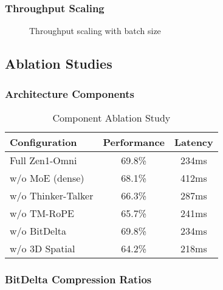 \subsubsection{Throughput Scaling}

\begin{figure}[h]
\centering
{}
\caption{Throughput scaling with batch size}
\end{figure}

\subsection{Ablation Studies}

\subsubsection{Architecture Components}

\begin{table}[h]
\centering
\caption{Component Ablation Study}
\begin{tabular}{lcc}
\hline
\textbf{Configuration} & \textbf{Performance} & \textbf{Latency} \\
\hline
Full Zen1-Omni & 69.8\% & 234ms \\
w/o MoE (dense) & 68.1\% & 412ms \\
w/o Thinker-Talker & 66.3\% & 287ms \\
w/o TM-RoPE & 65.7\% & 241ms \\
w/o BitDelta & 69.8\% & 234ms \\
w/o 3D Spatial & 64.2\% & 218ms \\
\hline
\end{tabular}
\end{table}

\subsubsection{BitDelta Compression Ratios}

